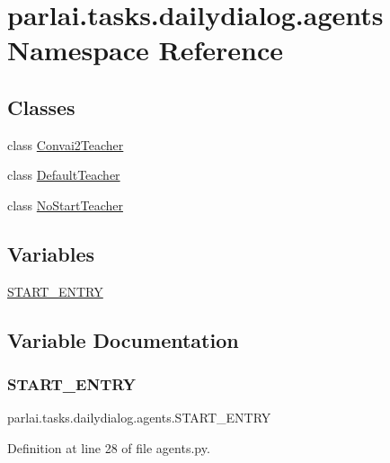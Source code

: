 \hypertarget{namespaceparlai_1_1tasks_1_1dailydialog_1_1agents}{}\section{parlai.\+tasks.\+dailydialog.\+agents Namespace Reference}
\label{namespaceparlai_1_1tasks_1_1dailydialog_1_1agents}
\subsection*{Classes}
\begin{DoxyCompactItemize}
\item 
class \hyperlink{classparlai_1_1tasks_1_1dailydialog_1_1agents_1_1Convai2Teacher}{Convai2\+Teacher}
\item 
class \hyperlink{classparlai_1_1tasks_1_1dailydialog_1_1agents_1_1DefaultTeacher}{Default\+Teacher}
\item 
class \hyperlink{classparlai_1_1tasks_1_1dailydialog_1_1agents_1_1NoStartTeacher}{No\+Start\+Teacher}
\end{DoxyCompactItemize}
\subsection*{Variables}
\begin{DoxyCompactItemize}
\item 
\hyperlink{namespaceparlai_1_1tasks_1_1dailydialog_1_1agents_a9718c042359fb6d880f80ed863ea28d3}{S\+T\+A\+R\+T\+\_\+\+E\+N\+T\+RY}
\end{DoxyCompactItemize}


\subsection{Variable Documentation}
\mbox{\label{namespaceparlai_1_1tasks_1_1dailydialog_1_1agents_a9718c042359fb6d880f80ed863ea28d3}} 
\subsubsection{\texorpdfstring{S\+T\+A\+R\+T\+\_\+\+E\+N\+T\+RY}{START\_ENTRY}}
{\footnotesize\ttfamily parlai.\+tasks.\+dailydialog.\+agents.\+S\+T\+A\+R\+T\+\_\+\+E\+N\+T\+RY}



Definition at line 28 of file agents.\+py.

